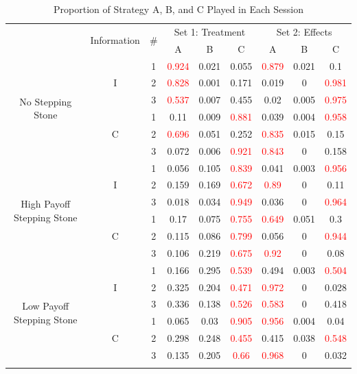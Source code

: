 \begin{table}[h]
\centering
\caption{Proportion of Strategy A, B, and C Played in Each Session}
\label{tab:propstrateach}
\begin{tabular}{ c c c c c c c c c} 
\Xhline{.1em}
\multirow{2}{8em}{Game} & \multirow{2}{5em}{Information} & \multirow{2}{1em}{\#} & \multicolumn{3}{c}{Set 1: Treatment} & \multicolumn{3}{c}{Set 2: Effects}\\
& & & A & B & C & A & B & C \\
\hline
\multirow{6}{8em}{No Stepping Stone} & \multirow{3}{0em}{I} & 1 & \textcolor{red}{0.924} & 0.021 & 0.055 & \textcolor{red}{0.879} & 0.021 & 0.1 \\ 
& & 2 & \textcolor{red}{0.828} & 0.001 & 0.171 & 0.019 & 0 & \textcolor{red}{0.981}\\ 
& & 3 & \textcolor{red}{0.537} & 0.007 & 0.455 & 0.02  & 0.005 & \textcolor{red}{0.975}\\ 
 & \multirow{3}{0em}{C} & 1 & 0.11 & 0.009 & \textcolor{red}{0.881} & 0.039 & 0.004 & \textcolor{red}{0.958} \\  
& & 2 & \textcolor{red}{0.696} & 0.051 & 0.252 & \textcolor{red}{0.835} & 0.015 & 0.15 \\ 
& & 3 & 0.072 & 0.006 & \textcolor{red}{0.921} & \textcolor{red}{0.843} & 0 & 0.158\\ 
\multirow{6}{8em}{High Payoff Stepping Stone} & \multirow{3}{0em}{I} & 1 & 0.056 & 0.105 & \textcolor{red}{0.839} & 0.041 & 0.003 & \textcolor{red}{0.956}\\ 
& & 2 & 0.159 & 0.169 & \textcolor{red}{0.672} & \textcolor{red}{0.89} & 0 & 0.11\\
& & 3 & 0.018 & 0.034 & \textcolor{red}{0.949} & 0.036 & 0 & \textcolor{red}{0.964}\\ 
 & \multirow{3}{0em}{C} & 1 & 0.17 & 0.075 & \textcolor{red}{0.755} & \textcolor{red}{0.649} & 0.051 & 0.3\\  
& & 2 & 0.115 & 0.086 & \textcolor{red}{0.799} & 0.056 & 0 & \textcolor{red}{0.944}\\ 
& & 3 & 0.106 & 0.219 & \textcolor{red}{0.675} & \textcolor{red}{0.92} & 0 & 0.08\\ 
\multirow{6}{8em}{Low Payoff Stepping Stone} & \multirow{3}{0em}{I} & 1 & 0.166 & 0.295 & \textcolor{red}{0.539} & 0.494 & 0.003 & \textcolor{red}{0.504} \\ 
& & 2 & 0.325 & 0.204 & \textcolor{red}{0.471} & \textcolor{red}{0.972} & 0 & 0.028\\
& & 3 & 0.336 & 0.138 & \textcolor{red}{0.526} & \textcolor{red}{0.583} & 0 & 0.418\\ 
 & \multirow{3}{0em}{C} & 1 & 0.065 & 0.03 & \textcolor{red}{0.905} & \textcolor{red}{0.956} & 0.004 & 0.04\\  
& & 2 & 0.298 & 0.248 & \textcolor{red}{0.455} & 0.415 & 0.038 & \textcolor{red}{0.548}\\ 
& & 3 & 0.135 & 0.205 & \textcolor{red}{0.66} & \textcolor{red}{0.968} & 0 & 0.032\\ 
\Xhline{.1em}
\end{tabular}
\end{table}%


